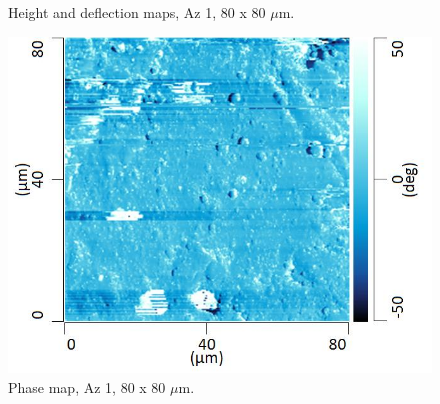 \begin{figure}[H]
\begin{minipage}{.45\textwidth}
\end{minipage}
\caption[Height and deflection maps, Az 1]{Height and deflection maps, Az 1, 80 x 80 $\mu$m.}
\label{fig:afm_az1_height_def_4}
\end{figure}

\begin{figure}[H]
\centering
  \includegraphics[width=.45\textwidth]{Az1_tapping_mode_240521_phase_4}
\caption[Phase map, Az 1]{Phase map, Az 1, 80 x 80 $\mu$m.}
\label{fig:afm_az1_phase_4}
\end{figure}


